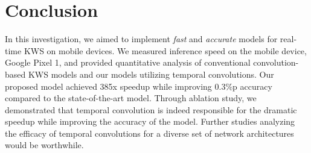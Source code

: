 \documentclass[a4paper]{article}
\begin{document}
\section{Conclusion} \label{section:conclusion}
In this investigation, we aimed to implement \emph{fast} and \emph{accurate} models for real-time KWS on mobile devices.
We measured inference speed on the mobile device, Google Pixel 1, and provided quantitative analysis of conventional convolution-based KWS models and our models utilizing temporal convolutions.
Our proposed model achieved 385x speedup while improving 0.3\%p accuracy compared to the state-of-the-art model.
Through ablation study, we demonstrated that temporal convolution is indeed responsible for the dramatic speedup while improving the accuracy of the model.
Further studies analyzing the efficacy of temporal convolutions for a diverse set of network architectures would be worthwhile.




\end{document}
